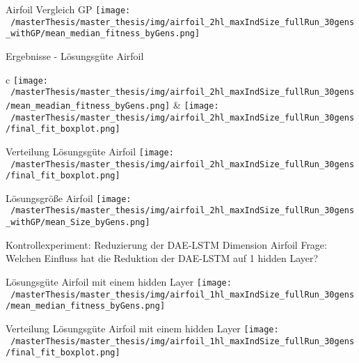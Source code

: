 \documentclass[
  ignorenonframetext,
]{beamer}
\begin{document}
\begin{frame}{Airfoil Vergleich GP}
\protect\hypertarget{airfoil-vergleich-gp}{}
\texttt{[image: ~/masterThesis/master\_thesis/img/airfoil\_2hl\_maxIndSize\_fullRun\_30gens\_withGP/mean\_median\_fitness\_byGens.png]}
\end{frame}

\begin{frame}{Ergebnisse - Lösungsgüte Airfoil}
\protect\hypertarget{ergebnisse---luxf6sungsguxfcte-airfoil}{}
\begin{tabular}{c}
\texttt{[image: ~/masterThesis/master\_thesis/img/airfoil\_2hl\_maxIndSize\_fullRun\_30gens/mean\_meadian\_fitness\_byGens.png]} &
\texttt{[image: ~/masterThesis/master\_thesis/img/airfoil\_2hl\_maxIndSize\_fullRun\_30gens/final\_fit\_boxplot.png]} \\

\end{tabular}
\end{frame}

\begin{frame}{Verteilung Lösungsgüte Airfoil}
\protect\hypertarget{verteilung-luxf6sungsguxfcte-airfoil}{}
\texttt{[image: ~/masterThesis/master\_thesis/img/airfoil\_2hl\_maxIndSize\_fullRun\_30gens/final\_fit\_boxplot.png]}
\end{frame}

\begin{frame}{Lösungsgröße Airfoil}
\protect\hypertarget{luxf6sungsgruxf6uxdfe-airfoil}{}
\texttt{[image: ~/masterThesis/master\_thesis/img/airfoil\_2hl\_maxIndSize\_fullRun\_30gens\_withGP/mean\_Size\_byGens.png]}
\end{frame}

\begin{frame}{Kontrollexperiment: Reduzierung der DAE-LSTM Dimension
Airfoil}
\protect\hypertarget{kontrollexperiment-reduzierung-der-dae-lstm-dimension-airfoil}{}
Frage: Welchen Einfluss hat die Reduktion der DAE-LSTM auf 1 hidden
Layer?
\end{frame}

\begin{frame}{Lösungsgüte Airfoil mit einem hidden Layer}
\protect\hypertarget{luxf6sungsguxfcte-airfoil-mit-einem-hidden-layer}{}
\texttt{[image: ~/masterThesis/master\_thesis/img/airfoil\_1hl\_maxIndSize\_fullRun\_30gens/mean\_median\_fitness\_byGens.png]}
\end{frame}

\begin{frame}{Verteilung Lösungsgüte Airfoil mit einem hidden Layer}
\protect\hypertarget{verteilung-luxf6sungsguxfcte-airfoil-mit-einem-hidden-layer}{}
\texttt{[image: ~/masterThesis/master\_thesis/img/airfoil\_1hl\_maxIndSize\_fullRun\_30gens/final\_fit\_boxplot.png]}
\end{frame}
\end{document}
